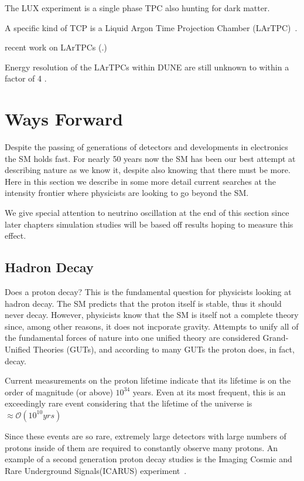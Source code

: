 The LUX experiment is a single phase TPC also hunting for dark matter.

A specific kind of TCP is a Liquid Argon Time Projection Chamber (LArTPC)~\citep{rubbia1977liquid}.

recent work on LArTPCs (\citep{ArgoNeuT_PhysRevD.99.012002, MicroBooNE_Acciarri_2017, LArIAT_Acciarri_2020}.)


Energy resolution of the LArTPCs within DUNE are still unknown to within a factor of 4 \citep{lartpc_energy_resolution:PhysRevD.99.036009}.


\section{Ways Forward}

Despite the passing of generations of detectors and developments in electronics the SM holds fast.
For nearly 50 years now the SM has been our best attempt at describing nature as we know it, despite also knowing that there must be more.
Here in this section we describe in some more detail current searches at the intensity frontier where physicists are looking to go beyond the SM.

We give special attention to neutrino oscillation at the end of this section since later chapters simulation studies will be based off results hoping to measure this effect.

\subsection{Hadron Decay}

Does a proton decay?
This is the fundamental question for physicists looking at hadron decay.
The SM predicts that the proton itself is stable, thus it should never decay.
However, physicists know that the SM is itself not a complete theory since, among other reasons, it does not incporate gravity.
Attempts to unify all of the fundamental forces of nature into one unified theory are considered Grand-Unified Theories (GUTs), and according to many GUTs the proton does, in fact, decay.

Current measurements on the proton lifetime indicate that its lifetime is on the order of magnitude (or above) $10^{34}$ years.
Even at its most frequent, this is an exceedingly rare event considering that the lifetime of the universe is $\approx \mathcal{O}(10^{10} yrs)$

Since these events are so rare, extremely large detectors with large numbers of protons inside of them are required to constantly observe many protons.
An example of a second generation proton decay studies is the Imaging Cosmic and Rare Underground Signals(ICARUS) experiment~\citep{ICARUS_2001}.

